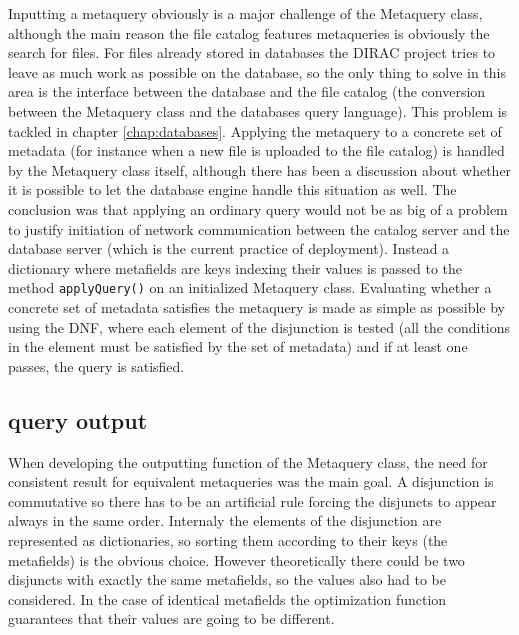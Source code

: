 Inputting a metaquery obviously is a major challenge of the Metaquery class, although the main reason the file
catalog features metaqueries is obviously the search for files. For files already stored in databases the DIRAC
project tries to leave as much work as possible on the database, so the only thing to solve in this area is the 
interface between the database and the file catalog (the conversion between the Metaquery class and the databases
query language). This problem is tackled in chapter \ref{chap:databases}. Applying the metaquery to a concrete 
set of metadata (for instance when a new file is uploaded to the file catalog) is handled by the Metaquery class 
itself, although there has been a discussion about whether it is possible to let the database engine handle this 
situation as well. The conclusion was that applying an ordinary query would not be as big of a problem to 
justify initiation of network communication between the catalog server and the database server (which is the 
current practice of deployment). Instead a dictionary where metafields are keys indexing their values is passed 
to the method \texttt{applyQuery()} on an initialized Metaquery class. Evaluating whether a concrete set of 
metadata satisfies the metaquery is made as simple as possible by using the DNF, where each element of the 
disjunction is tested (all the conditions in the element must be satisfied by the set of metadata) and if at least
one passes, the query is satisfied.

\subsection{query output}

When developing the outputting function of the Metaquery class, the need for consistent result for equivalent 
metaqueries was the main goal. A disjunction is commutative so there has to be an artificial rule forcing the 
disjuncts to appear always in the same order. Internaly the elements of the disjunction are represented as 
dictionaries, so sorting them according to their keys (the metafields) is the obvious choice. However theoretically
there could be two disjuncts with exactly the same metafields, so the values also had to be considered. In
the case of identical metafields the optimization function guarantees that their values are going to be different.